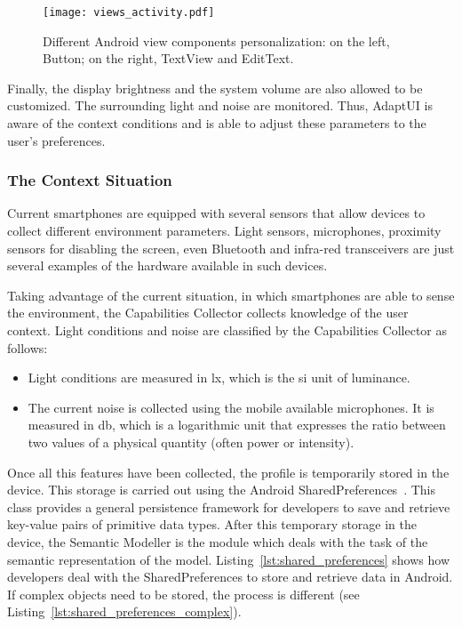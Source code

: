 \begin{figure}
\centering
\texttt{[image: views\_activity.pdf]}
\caption{Different Android view components
personalization: on the left, Button; on the right, TextView and EditText.}
\label{fig:views_activity}
\end{figure}

Finally, the display brightness and the system volume are also allowed to be
customized. The surrounding light and noise are monitored. Thus, AdaptUI is
aware of the context conditions and is able to adjust these parameters to 
the user's preferences.

 
\subsubsection{The Context Situation}
\label{sec:context_situation}
Current smartphones are equipped with several sensors that allow devices to
collect different environment parameters. Light sensors, microphones, proximity 
sensors for disabling the screen, even Bluetooth and infra-red transceivers are 
just several examples of the hardware available in such devices.

Taking advantage of the current situation, in which smartphones are able to sense
the environment, the Capabilities Collector collects knowledge of the user context.
Light conditions and noise are classified by the Capabilities Collector as follows:

\begin{itemize}
 \item Light conditions are measured in \ac{lx}, which is the \ac{si} unit of 
 luminance.
 
 \item The current noise is collected using the mobile available microphones. It
 is measured in \ac{db}, which is a logarithmic unit that expresses the ratio
 between two values of a physical quantity (often power or intensity).
\end{itemize}

Once all this features have been collected, the profile is temporarily stored in 
the device. This storage is carried out using the Android 
SharedPreferences~\citep{shared_preferences}. This class provides a general 
persistence framework for developers to save and retrieve key-value pairs of 
primitive data types. After this temporary storage in the device, the Semantic 
Modeller is the module which deals with the task of the semantic representation 
of the model. Listing~\ref{lst:shared_preferences} shows how developers deal 
with the SharedPreferences to store and retrieve data in Android. If complex
objects need to be stored, the process is different (see Listing~\ref{lst:shared_preferences_complex}).

